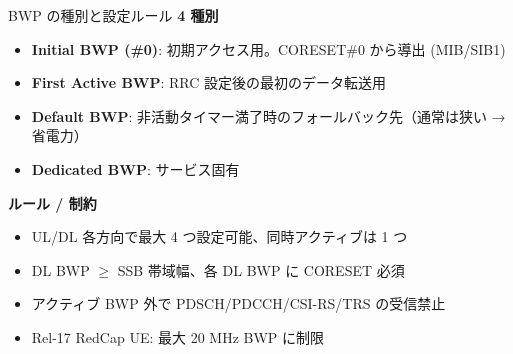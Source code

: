 \begin{frame}{BWP の種別と設定ルール}
\textbf{4 種別}
\begin{itemize}
  \item \textbf{Initial BWP (\#0)}: 初期アクセス用。CORESET\#0 から導出 (MIB/SIB1)
  \item \textbf{First Active BWP}: RRC 設定後の最初のデータ転送用
  \item \textbf{Default BWP}: 非活動タイマー満了時のフォールバック先（通常は狭い → 省電力）
  \item \textbf{Dedicated BWP}: サービス固有
\end{itemize}

\textbf{ルール / 制約}
\begin{itemize}
  \item UL/DL 各方向で最大 4 つ設定可能、同時アクティブは 1 つ
  \item DL BWP $\geq$ SSB 帯域幅、各 DL BWP に CORESET 必須
  \item アクティブ BWP 外で PDSCH/PDCCH/CSI-RS/TRS の受信禁止
  \item Rel-17 RedCap UE: 最大 20 MHz BWP に制限
\end{itemize}
\end{frame}
